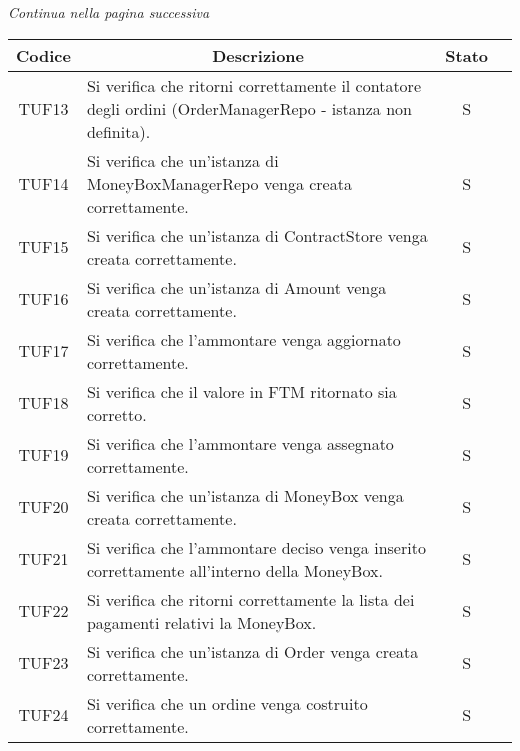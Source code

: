 \begin{center}
  \textit{\small Continua nella pagina successiva}
\end{center}
\begin{table}[H]
  \centering
  \renewcommand{\arraystretch}{1.8}
  \begin{tabular}{c|p{8cm}|c|c}
    \rowcolor[HTML]{125E28}
    \color[HTML]{FFFFFF}\textbf{Codice}
          & \multicolumn{1}{c}{\color[HTML]{FFFFFF}\textbf{Descrizione}}
          & \color[HTML]{FFFFFF}\textbf{Stato}                                                                             \\
    \hline
    TUF13 & Si verifica che ritorni correttamente il contatore degli ordini (OrderManagerRepo - istanza non definita). & S \\
    TUF14 & Si verifica che un'istanza di MoneyBoxManagerRepo venga creata correttamente.                              & S \\
    TUF15 & Si verifica che un'istanza di ContractStore venga creata correttamente.                                    & S \\
    TUF16 & Si verifica che un'istanza di Amount venga creata correttamente.                                           & S \\
    TUF17 & Si verifica che l'ammontare venga aggiornato correttamente.                                                & S \\
    TUF18 & Si verifica che il valore in FTM\glo{} ritornato sia corretto.                                             & S \\
    TUF19 & Si verifica che l'ammontare venga assegnato correttamente.                                                 & S \\
    TUF20 & Si verifica che un'istanza di MoneyBox venga creata correttamente.                                         & S \\
    TUF21 & Si verifica che l'ammontare deciso venga inserito correttamente all'interno della MoneyBox\glo{}.          & S \\
    TUF22 & Si verifica che ritorni correttamente la lista dei pagamenti relativi la MoneyBox\glo{}.                   & S \\
    TUF23 & Si verifica che un'istanza di Order venga creata correttamente.                                            & S \\
    TUF24 & Si verifica che un ordine venga costruito correttamente.                                                   & S \\

\end{tabular}
\end{table}
